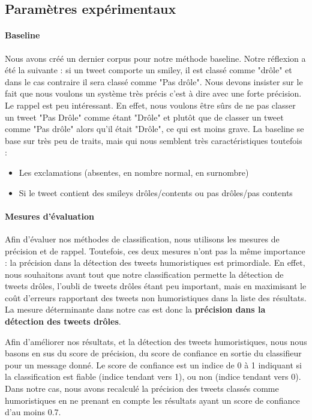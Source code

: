 \documentclass[10pt,a4paper,twoside]{article}
\begin{document}
\subsection{Paramètres expérimentaux}


\paragraph{Baseline}
Nous avons créé un dernier corpus pour notre méthode baseline. Notre réflexion a été la suivante : si un tweet comporte un smiley, il est classé comme "drôle" et dans le cas contraire il sera classé comme "Pas drôle". Nous devons insister sur le fait que nous voulons un système très précis c'est à dire avec une forte précision. Le rappel est peu intéressant. En effet, nous voulons être sûrs de ne pas classer un tweet "Pas Drôle" comme étant "Drôle" et plutôt que de classer un tweet comme "Pas drôle" alors qu'il était "Drôle", ce qui est moins grave.
La baseline se base sur très peu de traits, mais qui nous semblent très caractéristiques toutefois :
\begin{itemize}
\item Les exclamations (absentes, en nombre normal, en surnombre)
\item Si le tweet contient des smileys drôles/contents ou pas drôles/pas contents 
\end{itemize}


\paragraph{Mesures d'évaluation}
Afin d'évaluer nos méthodes de classification, nous utilisons les mesures de précision et de rappel. Toutefois, ces deux mesures n'ont pas la même importance : la précision dans la détection des tweets humoristiques est primordiale. En effet, nous souhaitons avant tout que notre classification permette la détection de tweets drôles, l'oubli de tweets drôles étant peu important, mais en maximisant le coût d'erreurs rapportant des tweets non humoristiques dans la liste des résultats. La mesure déterminante dans notre cas est donc la \textbf{précision dans la détection des tweets drôles}.

Afin d'améliorer nos résultats, et la détection des tweets humoristiques, nous nous basons en sus du score de précision, du score de confiance en sortie du classifieur pour un message donné. Le score de confiance est un indice de 0 à 1 indiquant si la classification est fiable (indice tendant vers 1), ou non (indice tendant vers 0). Dans notre cas, nous avons recalculé la précision des tweets classés comme humoristiques en ne prenant en compte les résultats ayant un score de confiance d'au moins 0.7.
\end{document}
